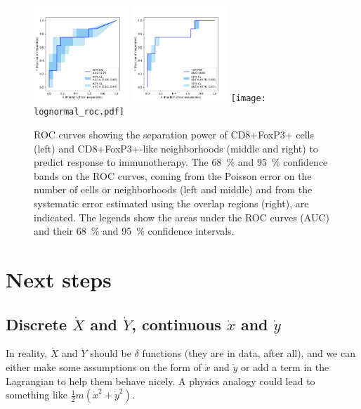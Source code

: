 \documentclass[11pt]{article}
\newcommand{\xdot}{\dot{x}}
\newcommand{\ydot}{\dot{y}}
\newcommand{\Xdot}{\dot{X}}
\newcommand{\Ydot}{\dot{Y}}
\begin{document}
\begin{figure}
\begin{center}
\includegraphics[width=0.32\textwidth]{poisson_roc_cells.pdf}
\includegraphics[width=0.32\textwidth]{poisson_roc_neighborhoods.pdf}
\texttt{[image: lognormal\_roc.pdf]}
\caption{ROC curves \autocite{SITC2023poster} showing the separation power of CD8+FoxP3+ cells (left) and CD8+FoxP3+-like neighborhoods (middle and right) to predict response to immunotherapy.  The \qty{68}{\%} and \qty{95}{\%} confidence bands on the ROC curves, coming from the Poisson error on the number of cells or neighborhoods (left and middle) and from the systematic error estimated using the overlap regions (right), are indicated.  The legends show the areas under the ROC curves (AUC) and their \qty{68}{\%} and \qty{95}{\%} confidence intervals.}
\label{fig:exampleroc_systematics_mc}
\end{center}
\end{figure}

\section{Next steps}

\subsection{Discrete \texorpdfstring{\(\Xdot\)}{Xdot} and \texorpdfstring{\(\Ydot\)}{Ydot}, continuous \texorpdfstring{\(\xdot\)}{xdot} and \texorpdfstring{\(\ydot\)}{ydot}}
In reality, \(\Xdot\) and \(\Ydot\) should be \(\delta\) functions (they are in data, after all), and we can either make some assumptions on the form of \(\xdot\) and \(\ydot\) or add a term in the Lagrangian to help them behave nicely.  A physics analogy could lead to something like \(\frac{1}{2}m(\xdot^2+\ydot^2)\).
\end{document}
